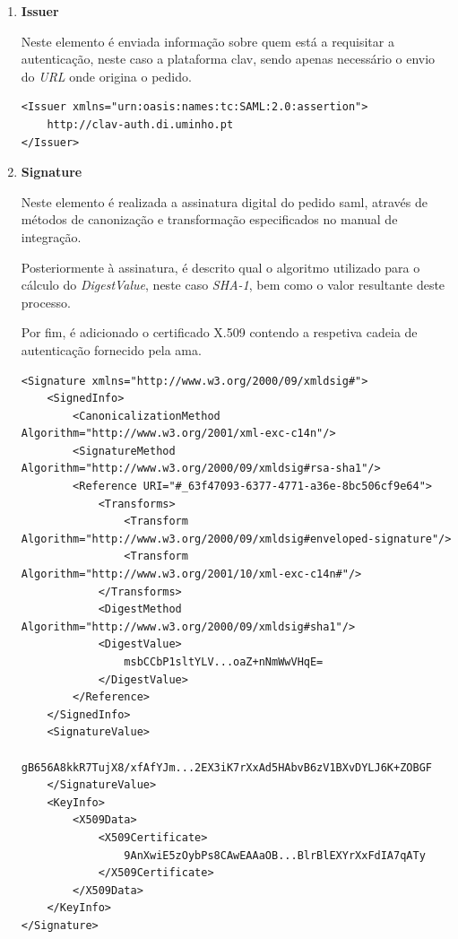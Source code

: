 \begin{enumerate}
    \item \textbf{Issuer}
    
    Neste elemento é enviada informação sobre quem está a requisitar a autenticação, neste caso a plataforma \gls{clav}, sendo apenas necessário o envio do \emph{URL} onde origina o pedido\cite{manualAuthGov}.
    
    \begin{lstlisting}
<Issuer xmlns="urn:oasis:names:tc:SAML:2.0:assertion">
    http://clav-auth.di.uminho.pt
</Issuer>
    \end{lstlisting}
    
    \vspace{-10mm}
    \item \textbf{Signature}
    
    Neste elemento é realizada a assinatura digital do pedido \gls{saml}, através de métodos de canonização e transformação especificados no manual de integração\cite{manualAuthGov}.
    
    Posteriormente à assinatura, é descrito qual o algoritmo utilizado para o cálculo do \emph{DigestValue}, neste caso \emph{SHA-1}, bem como o valor resultante deste processo.
    
    Por fim, é adicionado o certificado X.509 contendo a respetiva cadeia de autenticação fornecido pela \gls{ama}.
    
    \begin{lstlisting}
<Signature xmlns="http://www.w3.org/2000/09/xmldsig#">
    <SignedInfo>
        <CanonicalizationMethod Algorithm="http://www.w3.org/2001/xml-exc-c14n"/>
        <SignatureMethod Algorithm="http://www.w3.org/2000/09/xmldsig#rsa-sha1"/>
        <Reference URI="#_63f47093-6377-4771-a36e-8bc506cf9e64">
            <Transforms>
                <Transform Algorithm="http://www.w3.org/2000/09/xmldsig#enveloped-signature"/>
                <Transform Algorithm="http://www.w3.org/2001/10/xml-exc-c14n#"/>
            </Transforms>
            <DigestMethod Algorithm="http://www.w3.org/2000/09/xmldsig#sha1"/>
            <DigestValue>
                msbCCbP1sltYLV...oaZ+nNmWwVHqE=
            </DigestValue>
        </Reference>
    </SignedInfo>
    <SignatureValue>
            gB656A8kkR7TujX8/xfAfYJm...2EX3iK7rXxAd5HAbvB6zV1BXvDYLJ6K+ZOBGF
    </SignatureValue>
    <KeyInfo>
        <X509Data>
            <X509Certificate>
                9AnXwiE5zOybPs8CAwEAAaOB...BlrBlEXYrXxFdIA7qATy
            </X509Certificate>
        </X509Data>
    </KeyInfo>
</Signature>
    \end{lstlisting}
    

\end{enumerate}
